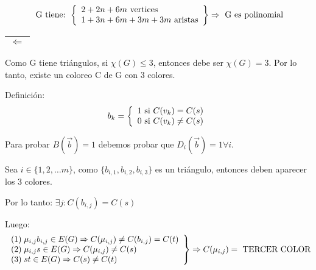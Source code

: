 \documentclass[12pt,a4paper]{report}
\newcounter{neq}
\begin{document}
				\begin{equation*}
					\textup{ G tiene: }
	  				\left \lbrace
			  		\begin{array}{l}
	    				2 + 2n + 6m \textup{ vertices} \\
	    				1 + 3n + 6m+ 3m + 3m \textup{ aristas}
			  		\end{array}
	  				\right\rbrace
						\Rightarrow \textup{ G es polinomial}
				\end{equation*}

			\vspace{5mm}
			\begin{tabular}{|c|} \hline $\Leftarrow$ \\\hline \end{tabular}
				\par Como G tiene triángulos, si $\chi (G) \leq 3$, entonces debe ser $\chi (G) = 3$. Por lo tanto, existe un coloreo C de G con 3 colores.
				\vspace{3mm}
				\par Definición:
				\begin{equation*}
					b_{k} =
		  		\left \lbrace
		  		\begin{array}{l}
		    		1 \textup{ si } C(v_{k}) = C(s) \\
		    		0 \textup{ si } C(v_{k}) \neq C(s)
		  		\end{array}
		  		\right.
				\end{equation*}
				\par Para probar $B(\overrightarrow{b}) = 1$ debemos probar que $D_{i}(\overrightarrow{b}) = 1 \forall i$.
				\par Sea $i \in \lbrace	1, 2, \dotsc m \rbrace$, como $ \lbrace b_{i, 1}, b_{i, 2}, b_{i, 3} \rbrace$ es un triángulo, entonces deben aparecer los 3 colores.
				\vspace{3mm}
				\par 	Por lo tanto: $\exists j : C(b_{i, j}) = C(s)$
				\vspace{3mm}
				\par Luego:
				\begin{equation*}
		  		\left.
		  		\begin{array}{l}
		    		(1) \; \mu_{i, j} b_{i, j} \in E(G) \Rightarrow C(\mu_{i, j}) \neq C(b_{i, j}) = C(t) \\
		    		(2) \; \mu_{i, j} s \in E(G) \Rightarrow C(\mu_{i, j}) \neq C(s) \\
		    		(3) \; s t \in E(G) \Rightarrow C(s) \neq C(t)
		  		\end{array}
		 			\right\rbrace
		 			\Rightarrow C(\mu_{i, j}) = \textup{ TERCER COLOR}
				\end{equation*}
\end{document}
